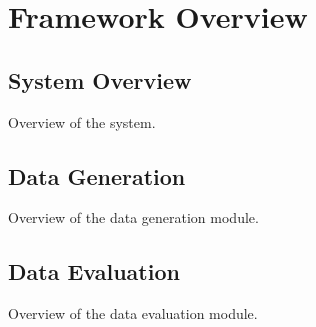 \section{Framework Overview} 
\label{sec:framework}

\subsection{System Overview}

Overview of the system.

\subsection{Data Generation}

Overview of the data generation module.


\subsection{Data Evaluation}

Overview of the data evaluation module.